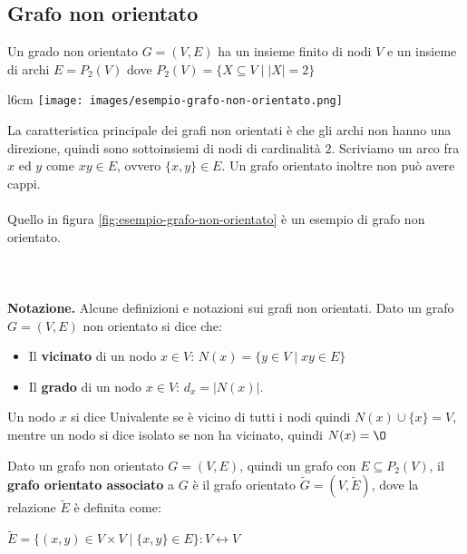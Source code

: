 \subsection{Grafo non orientato}
\begin{definition}
    Un grado non orientato $G = (V,E)$ ha un insieme finito di nodi $V$ e un insieme di archi $E = P_2(V)$ dove $P_2(V) = \{X \subseteq V \mid |X| = 2\}$
\end{definition}
\begin{wrapfigure}[8]{l}{6cm}
    \vspace{-15pt}
    \centering
    \texttt{[image: images/esempio-grafo-non-orientato.png]}
    \vspace{-5pt}
    \caption{Grafo G non oriento}
    \label{fig:esempio-grafo-non-orientato}
\end{wrapfigure}
La caratteristica principale dei grafi non orientati è che gli archi non hanno una direzione, quindi sono sottoinsiemi di nodi di cardinalità $2$. Scriviamo un arco fra $x$ ed $y$ come $xy \in E$, ovvero $\{x,y\} \in E$. Un grafo orientato inoltre non può avere cappi.\\ \\
Quello in figura \ref{fig:esempio-grafo-non-orientato} è un esempio di grafo non orientato. \\\\\\\\
\textbf{Notazione.} Alcune definizioni e notazioni sui grafi non orientati. Dato un grafo $G = (V,E)$ non orientato si dice che:
\begin{itemize}
    \item Il \textbf{vicinato} di un nodo $x \in V$: \hspace{.7cm} $N(x) = \{y \in V \mid xy \in E\}$
    \item Il \textbf{grado} di un nodo $x \in V$: \hspace{.7cm} $d_x = \lvert N(x)\rvert$.
\end{itemize}
\begin{definition}
    Un nodo $x$ si dice Univalente se è vicino di tutti i nodi quindi $N(x) \cup \{x\} = V$, mentre un nodo si dice isolato se non ha vicinato, quindi $N(x) = \O$
\end{definition}

\begin{definition}
    Dato un grafo non orientato $G = (V,E)$, quindi un grafo con $E \subseteq P_2(V)$, il \textbf{grafo orientato associato} a $G$ è il grafo orientato $\widetilde{G} = (V, \widetilde{E})$, dove la relazione $\widetilde{E}$ è definita come:
    \begin{center}
        $\widetilde{E} = \{(x,y) \in V \times V \mid \{x,y\} \in E\}: V \leftrightarrow V$
    \end{center}
\end{definition}

